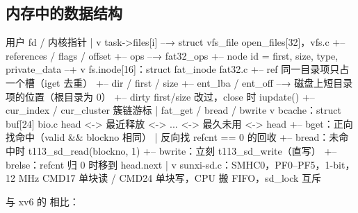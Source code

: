 \subsection{内存中的数据结构}

\begin{txtcode}
用户 fd / 内核指针
      |
      v
task->files[i] --→ struct vfs_file              open_files[32]，vfs.c
                   +-- references / flags / offset
                   +-- ops --→ fat32_ops
                   +-- node { id = first, size, type,
                              private_data } --+
                                               v
                             fs.inode[16]：struct fat_inode      fat32.c
                             +-- ref                    同一目录项只占一个槽（iget 去重）
                             +-- dir / first / size
                             +-- ent_lba / ent_off --→ 磁盘上短目录项的位置（根目录为 0）
                             +-- dirty                  first/size 改过，close 时 iupdate()
                             +-- cur_index / cur_cluster  簇链游标
                                               | fat_get / bread / bwrite
                                               v
                             bcache：struct buf[24]               bio.c
                             head <-> 最近释放 <-> ... <-> 最久未用 <-> head
                             +-- bget：正向找命中（valid && blockno 相同）
                             |         反向找 refcnt == 0 的回收
                             +-- bread：未命中时 t113_sd_read(blockno, 1)
                             +-- bwrite：立刻 t113_sd_write（直写）
                             +-- brelse：refcnt 归 0 时移到 head.next
                                               |
                                               v
                             sunxi-sd.c：SMHC0，PF0–PF5，1-bit，12 MHz
                             CMD17 单块读 / CMD24 单块写，CPU 搬 FIFO，sd_lock 互斥
\end{txtcode}

与 xv6 的  相比：

